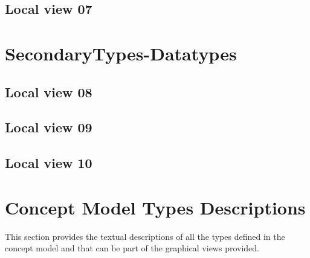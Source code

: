 \subsection{Local view 07}
\label{sec:lu.uni.lassy.excalibur.group09.spec-CM-view-local-PrimaryTypes-Datatypes-07}






\section{SecondaryTypes-Datatypes}
\subsection{Local view 08}
\label{sec:lu.uni.lassy.excalibur.group09.spec-CM-view-local-SecondaryTypes-Datatypes-08}

\subsection{Local view 09}
\label{sec:lu.uni.lassy.excalibur.group09.spec-CM-view-local-SecondaryTypes-Datatypes-09}

\subsection{Local view 10}
\label{sec:lu.uni.lassy.excalibur.group09.spec-CM-view-local-SecondaryTypes-Datatypes-10}






\section{Concept Model Types Descriptions}
This section provides the textual descriptions of all the types defined in the concept model and that can be part of the graphical views provided.













